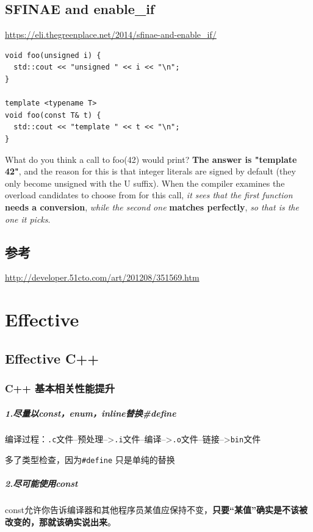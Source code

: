 \documentclass[UTF8,a4paper,12pt]{ctexbook}
\begin{document}
\section{SFINAE and enable\_if}
	\url{https://eli.thegreenplace.net/2014/sfinae-and-enable_if/}
	
	\begin{lstlisting}
void foo(unsigned i) {
  std::cout << "unsigned " << i << "\n";
}

template <typename T>
void foo(const T& t) {
  std::cout << "template " << t << "\n";
}	
	\end{lstlisting}
	
	What do you think a call to foo(42) would print? \textbf{The answer is "template 42"}, and the reason for this is that integer literals are signed by default (they only become unsigned with the U suffix). When the compiler examines the overload candidates to choose from for this call, \textit{it sees that the first function} \textbf{needs a conversion}, \textit{while the second one} \textbf{matches perfectly}, \textit{so that is the one it picks}.
	
\section{参考}\url{http://developer.51cto.com/art/201208/351569.htm}    

\chapter{Effective}
	\section{Effective C++}
		\subsection{C++ 基本相关性能提升}
		\paragraph{1.尽量以const，enum，inline替换\#define} 编译过程：\verb|.c|文件--预处理-->\verb|.i|文件--编译-->\verb|.o|文件--链接-->\verb|bin|文件
		
		多了类型检查，因为\verb|#define| 只是单纯的替换
		\paragraph{2.尽可能使用const} const允许你告诉编译器和其他程序员某值应保持不变，\textbf{只要“某值”确实是不该被改变的，那就该确实说出来}。
\end{document}
